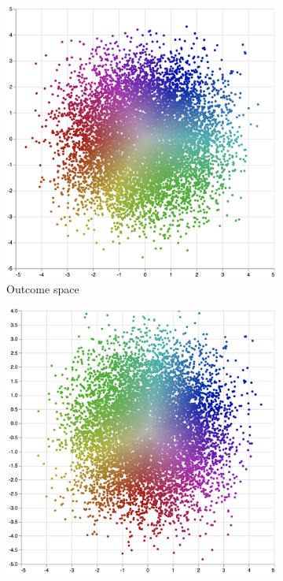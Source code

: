 \begin{figure}[h]
\centering
\begin{subfigure}[t]{0.3\textwidth}
    \includegraphics[width=\textwidth]{figures/dyne/state_space_rainbow.png}
    \caption{Outcome space}
\end{subfigure}
\begin{subfigure}[t]{0.3\textwidth}
    \includegraphics[width=\textwidth]{figures/dyne/latent_space_rainbow.png}

\end{subfigure}
\end{figure}
